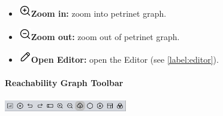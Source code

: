 \documentclass[10pt, a4paper]{article}
\begin{document}
\begin{itemize}
\item\includegraphics[scale=0.4]{../../src/resources/images/Toolbar/zoom-in.png}\hspace{0.1cm}\textbf{Zoom in:} zoom into petrinet graph.
\item\includegraphics[scale=0.4]{../../src/resources/images/Toolbar/zoom-out.png}\hspace{0.1cm}\textbf{Zoom out:} zoom out of petrinet graph.
\item\includegraphics[scale=0.4]{../../src/resources/images/Toolbar/edit.png}\hspace{0.1cm}\textbf{Open Editor:} open the Editor (see \ref{label:editor}).
\end{itemize}

\paragraph{Reachability Graph Toolbar}

\includegraphics[height=0.5cm]{Viewer_Reachability_Toolbar.png}
\end{document}
